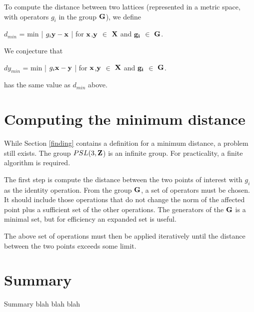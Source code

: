 \documentclass[preprint]{iucr}              %
\numberwithin{equation}{section}
\newcommand{\CIII}[0]{$\bf{C^{3}}$}
\begin{document}
	To compute the distance between two lattices (represented
	in a metric space, with operators $g_{i}$ in the group $\bf{G}$), we define
	
	$d_{min}$ = min \bigg| $g_{i}\bf{y}-\bf{x}$ \bigg| for 
	$\bf{x}$,$\bf{y}$ $\in$ $\bf{X}$ and
	$\bf{g_i}$ $\in$ $\bf{G}$.
	
	\noindent
	We conjecture that 
		
	$dy_{min}$ = min \bigg| $g_{i}\bf{x}-\bf{y}$ \bigg| for 
	$\bf{x}$,$\bf{y}$ $\in$ $\bf{X}$ and
	$\bf{g_i}$ $\in$ $\bf{G}$.
	
	\noindent
	has the same value as $d_{min}$ above.
	
	\section{Computing the minimum distance}
	
	While Section \ref{finding} contains a definition 
	for a minimum distance, a problem still exists. The
	group $PSL(3,\bf{Z}$) is an infinite group. For 
	practicality, a finite algorithm is required.
	
	The first step is compute the distance between the
	two points of interest with $g_i$ as the identity 
	operation. From the group $\bf{G}$, a set of operators
	must be chosen. It should include those operations that
	do not change the norm of the affected point plus
	a sufficient set of the other operations. The generators
	of the $\bf{G}$ is a minimal set, but for efficiency
	an expanded set is useful. 
	
	The above set of operations must then be applied
	iteratively until the distance between the two
	points exceeds some limit.
	



	
	\section{Summary}
	
	Summary blah blah blah
	
	
	
	
	
	
%	
	
\end{document}
